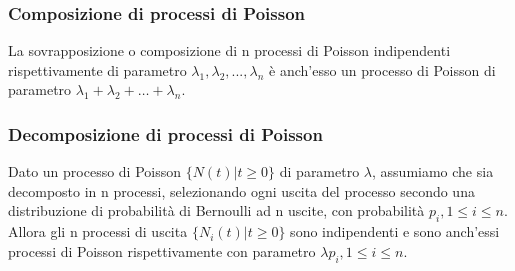 \subsubsection{Composizione di processi di Poisson}
La sovrapposizione o composizione di n processi di Poisson indipendenti rispettivamente di parametro $ \lambda_{1}, \lambda_{2} , ..., \lambda_{n}$ è anch’esso un processo di Poisson di parametro $\lambda_{1}+\lambda_{2} +…+\lambda_{n} $.

\subsubsection{Decomposizione di processi di Poisson}
Dato un processo di Poisson $\{N(t) | t\geq 0\}$ di parametro $\lambda$, assumiamo che sia decomposto in n processi, selezionando ogni uscita del processo secondo una distribuzione di probabilità di Bernoulli ad n uscite, con probabilità $p_i, 1\leq i \leq n$. Allora gli n processi di uscita $\{N_i(t)| t\geq 0\} $ sono indipendenti e sono anch'essi processi di Poisson rispettivamente con parametro $\lambda p_i, 1\leq i \leq n$.


